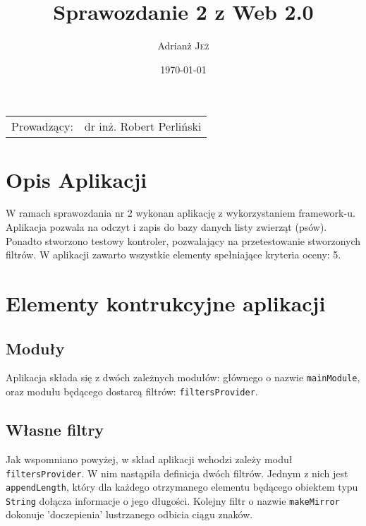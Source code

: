 \documentclass{article}
\title{Sprawozdanie 2 z Web 2.0} %
\author{Adrianż \textsc{Jeż}} %
\date{\today} %
\begin{document}
\maketitle %

\begin{center}
\begin{tabular}{l r}
Prowadzący: & dr inż. Robert Perliński %
\end{tabular}
\end{center}



\section{Opis Aplikacji}

W ramach sprawozdania nr 2 wykonan aplikację z wykorzystaniem framework-u. Aplikacja pozwala na odczyt i zapis do bazy danych listy zwierząt (psów). Ponadto stworzono testowy kontroler, pozwalający na przetestowanie stworzonych filtrów. W aplikacji zawarto wszystkie elementy spełniające kryteria oceny: 5.


\section{Elementy kontrukcyjne aplikacji}

\subsection{Moduły}
Aplikacja składa się z dwóch zależnych modułów: głównego o nazwie \verb|mainModule|, oraz modułu będącego dostarcą filtrów: \verb|filtersProvider|.

\subsection{Własne filtry}
Jak wspomniano powyżej, w skład aplikacji wchodzi zależy moduł \verb|filtersProvider|. W nim nastąpiła definicja dwóch filtrów. Jednym z nich jest \verb|appendLength|, który dla każdego otrzymanego elementu będącego obiektem typu \verb|String| dołącza informacje o jego długości. Kolejny filtr o nazwie \verb|makeMirror| dokonuje 'doczepienia' lustrzanego odbicia ciągu znaków.  
\end{document}
